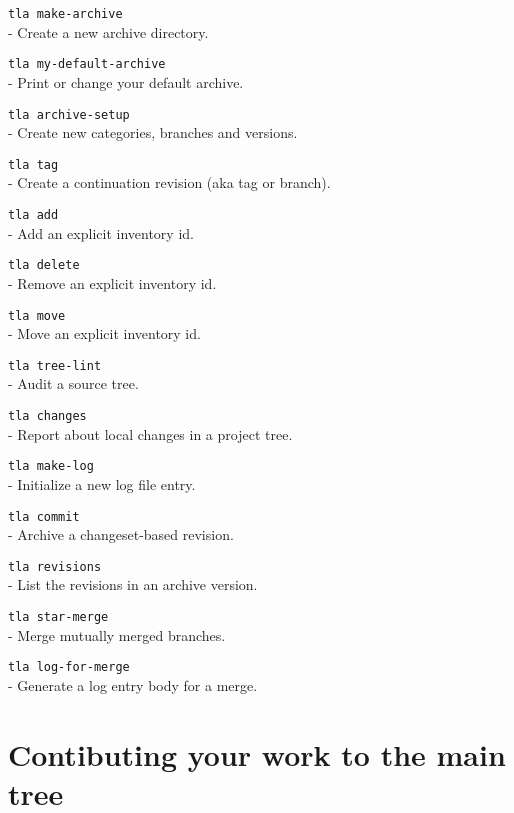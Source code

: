 \begin{table}
  \begin{api}
    {\tt tla make-archive}\\
    - Create a new archive directory.

    {\tt tla my-default-archive}\\
    - Print or change your default archive.

    {\tt tla archive-setup}\\
    - Create new categories, branches and versions.

    {\tt tla tag}\\
    - Create a continuation revision (aka tag or branch).

    {\tt tla add}\\
    - Add an explicit inventory id.

    {\tt tla delete}\\
    - Remove an explicit inventory id.

    {\tt tla move}\\
    - Move an explicit inventory id.

    {\tt tla tree-lint}\\
    - Audit a source tree.

    {\tt tla changes}\\
    - Report about local changes in a project tree.

    {\tt tla make-log}\\
    - Initialize a new log file entry.

    {\tt tla commit}\\
    - Archive a changeset-based revision.

    {\tt tla revisions}\\
    - List the revisions in an archive version.

    {\tt tla star-merge}\\
    - Merge mutually merged branches.

    {\tt tla log-for-merge}\\
    - Generate a log entry body for a merge.
  \end{api}
  \caption{Maintaining private changes: summary}
  \label{Table: tla commands 2}
\end{table}



\section{Contibuting your work to the main tree}

